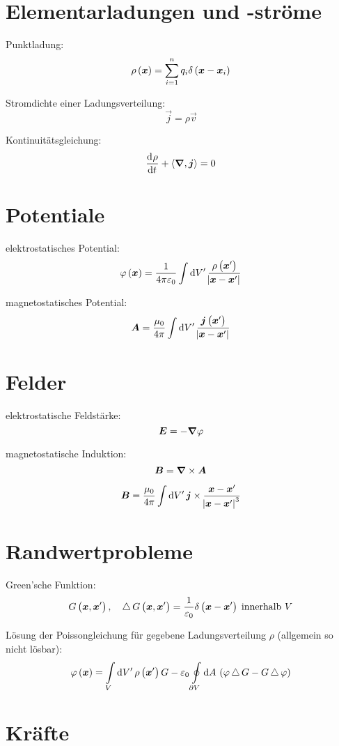 \section{Elementarladungen und -ströme}

Punktladung:
\[
	\rho\del{\vec x} = \sum_{i = 1}^n q_i \delta\del{\vec x - \vec x_i}
\]

Stromdichte einer Ladungsverteilung:
\[
	\vec j = \rho \vec v
\]

Kontinuitätsgleichung:
\[
	\dod \rho t + \divergence{\vec j} = 0
\]

\section{Potentiale}

elektrostatisches Potential:
\[
	\varphi\del{\vec x}
	= \frac{1}{4 \pi \varepsilon_0} \int \dif{V'} \,
	\frac{\rho\del{\vec x'}}{\abs{\vec x - \vec x'}}
\]

magnetostatisches Potential:
\[
	\vec A
	= \frac{\mu_0}{4 \pi} \int \dif{V'} \,
	\frac{\vec j\del{\vec x'}}{\abs{\vec x - \vec x'}}
\]

\section{Felder}

elektrostatische Feldstärke:
\[
	\boldsymbol{E} = - \boldsymbol{\nabla} \varphi
\]

magnetostatische Induktion:
\[
	\boldsymbol{B} = \boldsymbol{\nabla} \times \boldsymbol{A}
\]

\[
	\vec B = \frac{\mu_0}{4 \pi} \int \dif{V'} \, \vec j \times \frac{\vec x - \vec x'}{\abs{\vec x - \vec x'}^3}
\]

\section{Randwertprobleme}

Green'sche Funktion:
\[
	G\del{\vec x, \vec x'}
	\eqnsep
	\laplace G\del{\vec x, \vec x'}
	= \frac{1}{\varepsilon_0} \delta\del{\vec x - \vec x'} \; \text{innerhalb $V$}
\]

Lösung der Poissongleichung für gegebene Ladungsverteilung $\rho$ (allgemein so
nicht lösbar):
\[
	\varphi\del{\vec x}
	= \intop_{V} \dif{V'} \, \rho\del{\vec x'} G
	- \varepsilon_0 \ointop_{\partial V} \dif A \,
	\del{\varphi \laplace G - G \laplace \varphi}
\]

\section{Kräfte}


